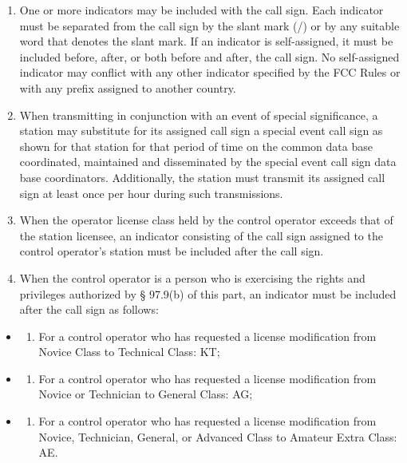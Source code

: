 \documentclass[
  letterpaper,
  DIV=11,
  numbers=noendperiod]{scrreport}
\providecommand{\tightlist}{%
  \setlength{\itemsep}{0pt}\setlength{\parskip}{0pt}}\usepackage{longtable,booktabs,array}
\begin{document}
\begin{enumerate}
\def\labelenumi{(\alph{enumi})}
\setcounter{enumi}{2}
\item
  One or more indicators may be included with the call sign. Each
  indicator must be separated from the call sign by the slant mark (/)
  or by any suitable word that denotes the slant mark. If an indicator
  is self-assigned, it must be included before, after, or both before
  and after, the call sign. No self-assigned indicator may conflict with
  any other indicator specified by the FCC Rules or with any prefix
  assigned to another country.
\item
  When transmitting in conjunction with an event of special
  significance, a station may substitute for its assigned call sign a
  special event call sign as shown for that station for that period of
  time on the common data base coordinated, maintained and disseminated
  by the special event call sign data base coordinators. Additionally,
  the station must transmit its assigned call sign at least once per
  hour during such transmissions.
\item
  When the operator license class held by the control operator exceeds
  that of the station licensee, an indicator consisting of the call sign
  assigned to the control operator's station must be included after the
  call sign.
\item
  When the control operator is a person who is exercising the rights and
  privileges authorized by § 97.9(b) of this part, an indicator must be
  included after the call sign as follows:
\end{enumerate}

\begin{itemize}
\item
  \begin{enumerate}
  \def\labelenumi{(\arabic{enumi})}
  \tightlist
  \item
    For a control operator who has requested a license modification from
    Novice Class to Technical Class: KT;
  \end{enumerate}
\item
  \begin{enumerate}
  \def\labelenumi{(\arabic{enumi})}
  \setcounter{enumi}{1}
  \tightlist
  \item
    For a control operator who has requested a license modification from
    Novice or Technician to General Class: AG;
  \end{enumerate}
\item
  \begin{enumerate}
  \def\labelenumi{(\arabic{enumi})}
  \setcounter{enumi}{2}
  \tightlist
  \item
    For a control operator who has requested a license modification from
    Novice, Technician, General, or Advanced Class to Amateur Extra
    Class: AE.
  \end{enumerate}
\end{itemize}
\end{document}
